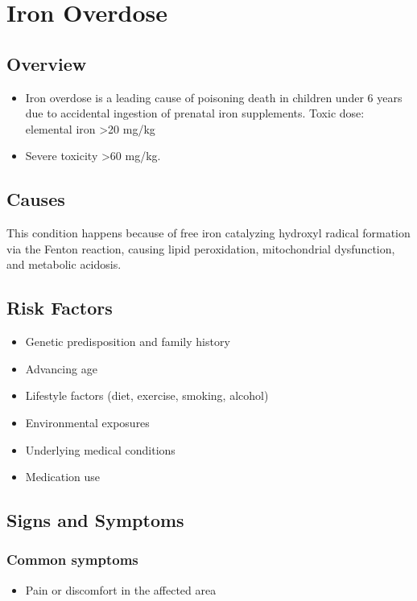 \chapter{Iron Overdose}
\label{sec:Iron Overdose}

\section{Overview}


\begin{itemize}[noitemsep]
  \item Iron overdose is a leading cause of poisoning death in children under 6 years due to accidental ingestion of prenatal iron supplements. Toxic dose: elemental iron >20 mg/kg
  \item Severe toxicity >60 mg/kg.
\end{itemize}
\section{Causes}
This condition happens because of free iron catalyzing hydroxyl radical formation via the Fenton reaction, causing lipid peroxidation, mitochondrial dysfunction, and metabolic acidosis.     
\section{Risk Factors}

\begin{itemize}[noitemsep]
  \item Genetic predisposition and family history
  \item Advancing age
  \item Lifestyle factors (diet, exercise, smoking, alcohol)
  \item Environmental exposures
  \item Underlying medical conditions
  \item Medication use
\end{itemize}
\section{Signs and Symptoms}

\subsection{Common symptoms}
\begin{itemize}[noitemsep]
  \item Pain or discomfort in the affected area
  \end{itemize}

